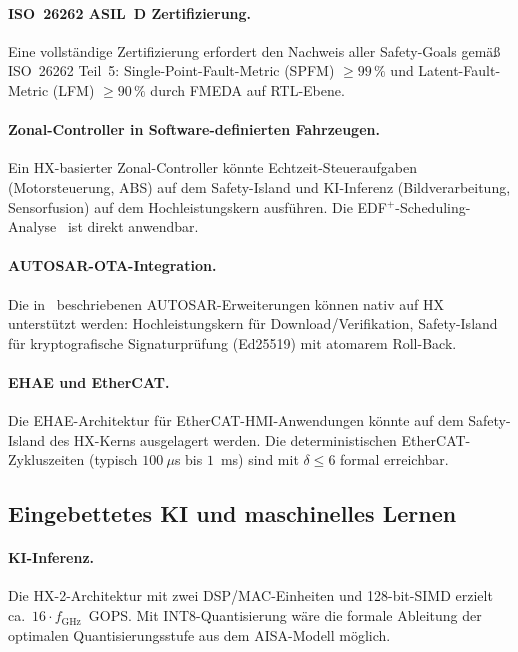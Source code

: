 ﻿\documentclass[a4paper,12pt]{article}
\theoremstyle{plain}
\theoremstyle{definition}
\theoremstyle{remark}
\begin{document}
\paragraph{ISO~26262 ASIL~D Zertifizierung.}
Eine vollst\"andige Zertifizierung erfordert den Nachweis aller Safety-Goals
gem\"a\ss{} ISO~26262 Teil~5: Single-Point-Fault-Metric (SPFM) $\geq99\,\%$
und Latent-Fault-Metric (LFM) $\geq90\,\%$ durch FMEDA auf RTL-Ebene.

\paragraph{Zonal-Controller in Software-definierten Fahrzeugen.}
Ein HX-basierter Zonal-Controller k\"onnte Echtzeit-Steueraufgaben (Motorsteuerung,
ABS) auf dem Safety-Island und KI-Inferenz (Bildverarbeitung, Sensorfusion) auf
dem Hochleistungskern ausf\"uhren. Die EDF$^+$-Scheduling-Analyse~\cite{epp2026b}
ist direkt anwendbar.

\paragraph{AUTOSAR-OTA-Integration.}
Die in~\cite{epp2026a} beschriebenen AUTOSAR-Erweiterungen k\"onnen nativ auf HX
unterst\"utzt werden: Hochleistungskern f\"ur Download/Verifikation, Safety-Island
f\"ur kryptografische Signaturpr\"ufung (Ed25519) mit atomarem Roll-Back.

\paragraph{EHAE und EtherCAT.}
Die EHAE-Architektur f\"ur EtherCAT-HMI-Anwendungen k\"onnte auf dem
Safety-Island des HX-Kerns ausgelagert werden. Die deterministischen
EtherCAT-Zykluszeiten (typisch $100~\mu$s bis $1$~ms) sind mit
$\delta\leq6$ formal erreichbar.

\subsection{Eingebettetes KI und maschinelles Lernen}

\paragraph{KI-Inferenz.}
Die HX-2-Architektur mit zwei DSP/MAC-Einheiten und 128-bit-SIMD erzielt
ca.\ $16\cdot f_\mathrm{GHz}$~GOPS. Mit INT8-Quantisierung w\"are die formale
Ableitung der optimalen Quantisierungsstufe aus dem AISA-Modell m\"oglich.
\end{document}
